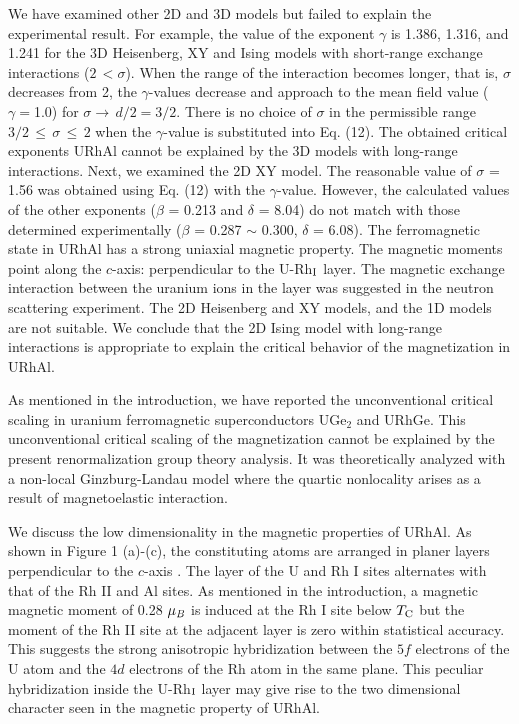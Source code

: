 \documentclass[twocolumn,showpacs,preprintnumbers,amsmath,amssymb]{revtex4}
\begin{document}
We have examined other 2D and 3D models but failed to explain the experimental result. For example, the value of the exponent $\gamma$ is 1.386, 1.316, and 1.241 for the 3D Heisenberg, XY and Ising models with short-range exchange interactions ($2{\,}{<}{\sigma}$). When the range of the interaction becomes longer, that is, ${\sigma}$ decreases from 2, the $\gamma$-values decrease and approach to the mean field value (${\gamma}=$1.0) for ${\sigma}{\rightarrow}{\,}{d/2}= 3/2$. There is no choice of $\sigma$ in the permissible range $3/2{\,}{\le}{\,}{\sigma}{\,}{\le}{\,}2$ when the $\gamma$-value is substituted into Eq. (12). The obtained critical exponents URhAl cannot be explained by the 3D models with long-range interactions. Next, we examined the 2D XY model. The reasonable value of $\sigma$ = 1.56 was obtained using Eq. (12) with the $\gamma$-value. However, the calculated values of the other exponents ($\beta$ = 0.213 and $\delta$ = 8.04) do not match with those determined experimentally ($\beta$ = 0.287 $\sim$ 0.300, $\delta$ = 6.08). The ferromagnetic state in URhAl has a strong uniaxial magnetic property. The magnetic moments point along the $c$-axis: perpendicular to the U-Rh$_{\rm I}$ layer. The magnetic exchange interaction between the uranium ions in the layer was suggested in the neutron scattering experiment\cite{paixao1}. The 2D Heisenberg and XY models, and the 1D models are not suitable. We conclude that the 2D Ising model with long-range interactions is appropriate to explain the critical behavior of the magnetization in URhAl. 

 As mentioned in the introduction, we have reported the unconventional critical scaling in uranium ferromagnetic superconductors UGe$_2$ and URhGe\cite{tateiwa1}. This unconventional critical scaling of the magnetization cannot be explained by the present renormalization group theory analysis. It was theoretically analyzed with a non-local Ginzburg-Landau model where the quartic nonlocality arises as a result of magnetoelastic interaction\cite{singh1}. 


  We discuss the low dimensionality in the magnetic properties of URhAl. As shown in Figure 1 (a)-(c), the constituting atoms are arranged in planer layers perpendicular to the $c$-axis . The layer of the U and Rh I sites alternates with that of the Rh II and Al sites.  As mentioned in the introduction, a magnetic magnetic moment of 0.28 ${\mu}_{\it B}$ is induced at the Rh I site below $T_{\rm C}$ but the moment of the Rh II site at the adjacent layer is zero within statistical accuracy\cite{paixao1}. This suggests the strong anisotropic hybridization between the $5f$ electrons of the U atom and the $4d$ electrons of the Rh atom in the same plane. This peculiar hybridization inside the U-Rh$_{\rm I}$ layer may give rise to the two dimensional character seen in the magnetic property of URhAl. 
      
\end{document}
